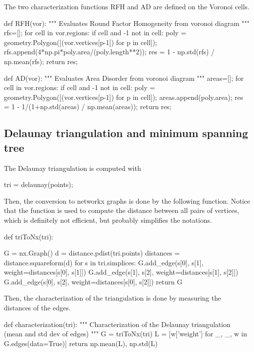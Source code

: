 The two characterization functions RFH and AD are defined on the Voronoi cells.

\begin{python}
def RFH(vor):
    """
    Evaluates Round Factor Homogeneity from voronoi diagram
    """
    rfs=[];
    for cell in vor.regions:
        if cell and -1 not in cell:
            poly = geometry.Polygon([(vor.vertices[p-1]) for p in cell]);
            rfs.append(4*np.pi*poly.area/(poly.length**2));
    res = 1 - np.std(rfs) / np.mean(rfs);            
    return res;
\end{python}

\begin{python}
def AD(vor):
    """
    Evaluates Area Disorder from voronoi diagram
    """
    areas=[];
    for cell in vor.regions:
        if cell and -1 not in cell:
            poly = geometry.Polygon([(vor.vertices[p-1]) for p in cell]);
            areas.append(poly.area);
    res = 1 - 1/(1+np.std(areas) / np.mean(areas));            
    return res;
\end{python}

\subsection{Delaunay triangulation and minimum spanning tree}
The Delaunay triangulation is computed with 
\begin{python}
tri = delaunay(points);
\end{python}

Then, the conversion to networkx graphs is done by the following function. Notice that the  function is used to compute the distance between all pairs of vertices, which is definitely not efficient, but probably simplifies the notations.

\begin{python}
def triToNx(tri):
    
    G = nx.Graph()
    d = distance.pdist(tri.points)
    distances = distance.squareform(d)
    for s in tri.simplices:
        G.add_edge(s[0], s[1], weight=distances[s[0], s[1]])
        G.add_edge(s[1], s[2], weight=distances[s[1], s[2]])
        G.add_edge(s[0], s[2], weight=distances[s[0], s[2]])
    return G
\end{python}

Then, the characterization of the triangulation is done by measuring the distances of the edges.
\begin{python}
def characterization(tri):
    """
    Characterization of the Delaunay triangulation (mean and std dev of edges)
    """
    G = triToNx(tri)
    L = [w['weight'] for _, _, w in G.edges(data=True)]
    return np.mean(L), np.std(L)
\end{python}

